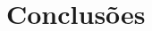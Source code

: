 \documentclass{llncs}
\begin{document}
\section{Conclusões}


%


\begin{thebibliography}{1}


\end{thebibliography}
\end{document}
